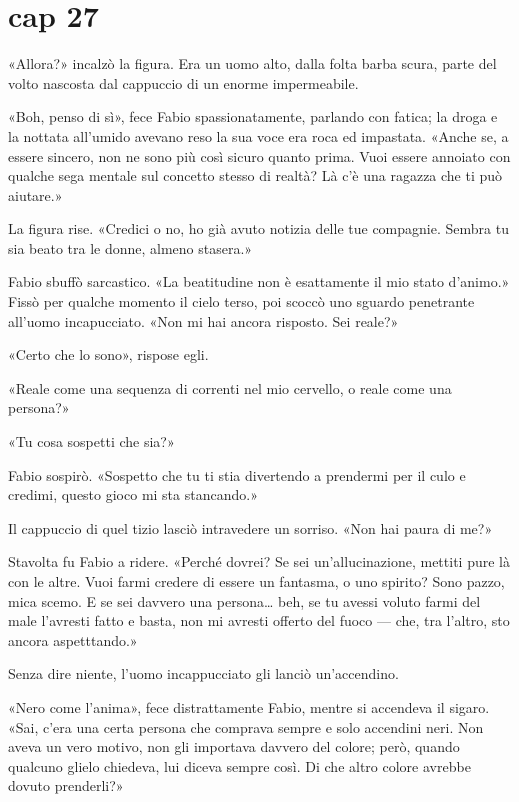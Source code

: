\chapter{cap 27}

«Allora?» incalzò la figura. Era un uomo alto, dalla folta barba scura,
parte del volto nascosta dal cappuccio di un enorme impermeabile.

«Boh, penso di sì», fece Fabio spassionatamente, parlando con fatica; la
droga e la nottata all'umido avevano reso la sua voce era roca ed
impastata. «Anche se, a essere sincero, non ne sono più così sicuro
quanto prima. Vuoi essere annoiato con qualche sega mentale sul concetto
stesso di realtà? Là c'è una ragazza che ti può aiutare.»

La figura rise. «Credici o no, ho già avuto notizia delle tue compagnie.
Sembra tu sia beato tra le donne, almeno stasera.»

Fabio sbuffò sarcastico. «La beatitudine non è esattamente il mio stato
d'animo.» Fissò per qualche momento il cielo terso, poi scoccò uno
sguardo penetrante all'uomo incapucciato. «Non mi hai ancora risposto.
Sei reale?»

«Certo che lo sono», rispose egli.

«Reale come una sequenza di correnti nel mio cervello, o reale come una
persona?»

«Tu cosa sospetti che sia?»

Fabio sospirò. «Sospetto che tu ti stia divertendo a prendermi per il
culo e credimi, questo gioco mi sta stancando.»

Il cappuccio di quel tizio lasciò intravedere un sorriso. «Non hai paura
di me?»

Stavolta fu Fabio a ridere. «Perché dovrei? Se sei un'allucinazione,
mettiti pure là con le altre. Vuoi farmi credere di essere un fantasma,
o uno spirito? Sono pazzo, mica scemo. E se sei davvero una
persona\ldots{} beh, se tu avessi voluto farmi del male l'avresti fatto
e basta, non mi avresti offerto del fuoco --- che, tra l'altro, sto
ancora aspetttando.»

Senza dire niente, l'uomo incappucciato gli lanciò un'accendino.

«Nero come l'anima», fece distrattamente Fabio, mentre si accendeva il
sigaro. «Sai, c'era una certa persona che comprava sempre e solo
accendini neri. Non aveva un vero motivo, non gli importava davvero del
colore; però, quando qualcuno glielo chiedeva, lui diceva sempre così.
Di che altro colore avrebbe dovuto prenderli?»

